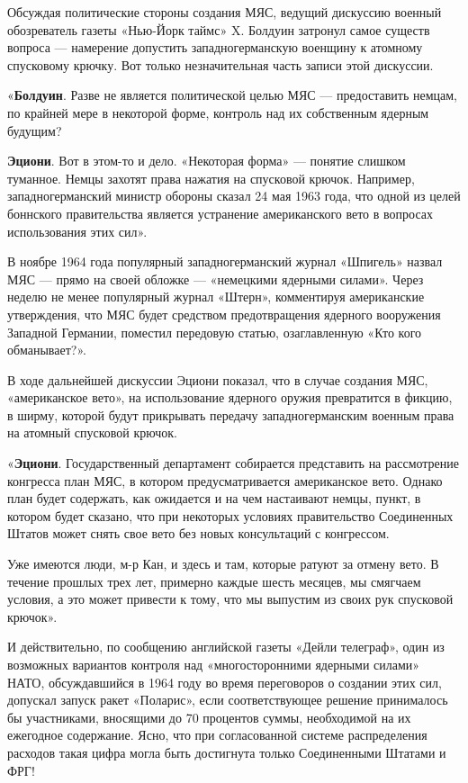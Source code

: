 \documentclass[12pt, a4paper, openany]{book}
\begin{document}
	Обсуждая политические стороны создания МЯС, ведущий дискуссию военный обозреватель газеты «Нью-Йорк таймс» X. Болдуин затронул самое существ вопроса — намерение допустить западногерманскую военщину к атомному спусковому крючку. Вот только незначительная часть записи этой дискуссии.
	
	«\textbf{Болдуин}. Разве не является политической целью МЯС — предоставить немцам, по крайней мере в некоторой форме, контроль над их собственным ядерным будущим?

\textbf{Эциони}. Вот в этом-то и дело. «Некоторая форма» — понятие слишком туманное. Немцы захотят права нажатия на спусковой крючок. Например, западногерманский министр обороны сказал 24 мая 1963 года, что одной из целей боннского правительства является устранение американского вето в вопросах использования этих сил».
	
	
	В ноябре 1964 года популярный западногерманский журнал «Шпигель» назвал МЯС — прямо на своей обложке — «немецкими ядерными силами». Через неделю не менее популярный журнал «Штерн», комментируя американские утверждения, что МЯС будет средством предотвращения ядерного вооружения Западной Германии, поместил передовую статью, озаглавленную «Кто кого обманывает?».
	
	В ходе дальнейшей дискуссии Эциони показал, что в случае создания МЯС, «американское вето», на использование ядерного оружия превратится в фикцию, в ширму, которой будут прикрывать передачу западногерманским военным права на атомный спусковой крючок.
	
	«\textbf{Эциони}. Государственный департамент собирается представить на рассмотрение конгресса план МЯС, в котором предусматривается американское вето. Однако план будет содержать, как ожидается и на чем настаивают немцы, пункт, в котором будет сказано, что при некоторых условиях правительство Соединенных Штатов может снять свое вето без новых консультаций с конгрессом.
	
	Уже имеются люди, м-р Кан, и здесь и там, которые ратуют за отмену вето. В течение прошлых трех лет, примерно каждые шесть месяцев, мы смягчаем условия, а это может привести к тому, что мы выпустим из своих рук спусковой крючок».
	
	И действительно, по сообщению английской газеты «Дейли телеграф», один из возможных вариантов контроля над «многосторонними ядерными силами» НАТО, обсуждавшийся в 1964 году во время переговоров о создании этих сил, допускал запуск ракет «Поларис», если соответствующее решение принималось бы участниками, вносящими до 70 процентов суммы, необходимой на их ежегодное содержание. Ясно, что при согласованной системе распределения расходов такая цифра могла быть достигнута только Соединенными Штатами и ФРГ!
	
\end{document}
